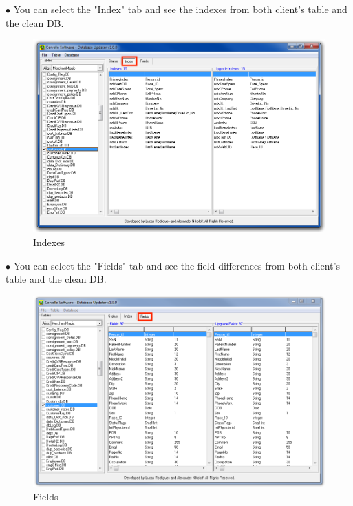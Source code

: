 \documentclass[a4paper, 11pt]{article}
\begin{document}
\pagebreak

\vspace*{\fill}
$\bullet$ You can select the "Index" tab and see the indexes from both client's table and the clean DB.
\begin{figure}[h]
    \centering
     \includegraphics[width=\textwidth]{capture 32}
    \caption{Indexes}
\end{figure}
\vspace*{\fill}
\pagebreak

\vspace*{\fill}
$\bullet$ You can select the "Fields" tab and see the field differences from both client's table and the clean DB.
\begin{figure}[h]
    \centering
     \includegraphics[width=\textwidth]{capture 33}
    \caption{Fields}
\end{figure}
\vspace*{\fill}
\pagebreak
\end{document}
